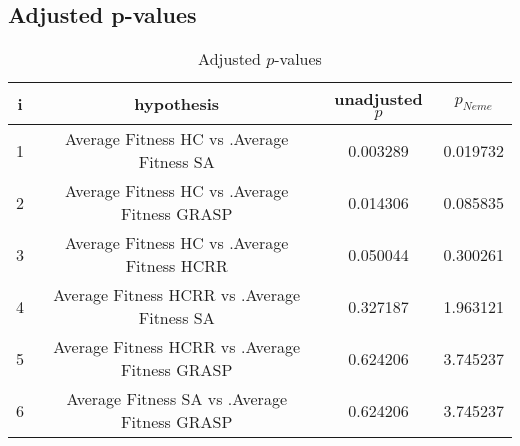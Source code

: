 \documentclass[a4paper,10pt]{article}
\begin{document}
\begin{landscape}
\pagebreak

\subsection{Adjusted p-values}

\begin{table}[!htp]
\centering\scriptsize
\begin{tabular}{cccc}
i&hypothesis&unadjusted $p$&$p_{Neme}$\\
\hline1&Average Fitness HC vs .Average Fitness SA&0.003289&0.019732\\
2&Average Fitness HC vs .Average Fitness GRASP&0.014306&0.085835\\
3&Average Fitness HC vs .Average Fitness HCRR&0.050044&0.300261\\
4&Average Fitness HCRR vs .Average Fitness SA&0.327187&1.963121\\
5&Average Fitness HCRR vs .Average Fitness GRASP&0.624206&3.745237\\
6&Average Fitness SA vs .Average Fitness GRASP&0.624206&3.745237\\
\hline
\end{tabular}
\caption{Adjusted $p$-values}
\end{table}

\end{landscape}
\end{document}
